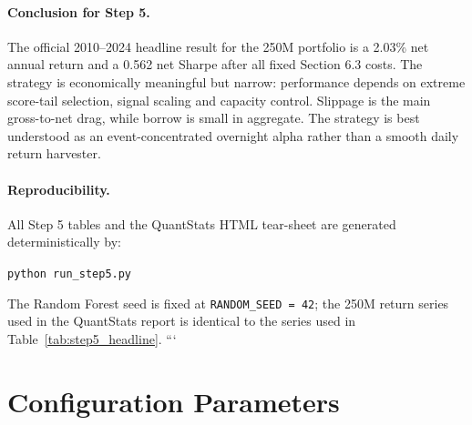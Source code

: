 \documentclass[12pt,a4paper]{article}
\begin{document}
\paragraph{Conclusion for Step 5.}
The official 2010--2024 headline result for the 250M portfolio is a 2.03\% net
annual return and a 0.562 net Sharpe after all fixed Section 6.3 costs. The
strategy is economically meaningful but narrow: performance depends on extreme
score-tail selection, signal scaling and capacity control. Slippage is the main
gross-to-net drag, while borrow is small in aggregate. The strategy is best
understood as an event-concentrated overnight alpha rather than a smooth daily
return harvester.

\paragraph{Reproducibility.}
All Step 5 tables and the QuantStats HTML tear-sheet are generated
deterministically by:
\begin{center}
\texttt{python run\_step5.py}
\end{center}
The Random Forest seed is fixed at \texttt{RANDOM\_SEED = 42}; the 250M return
series used in the QuantStats report is identical to the series used in
Table~\ref{tab:step5_headline}.
```

\appendix
\section{Configuration Parameters}
\end{document}
